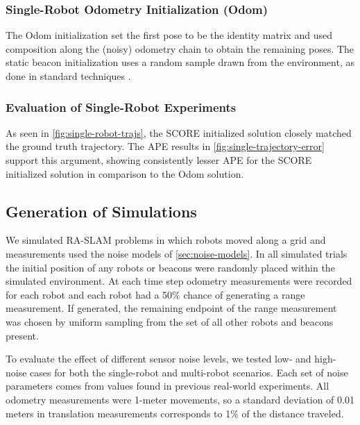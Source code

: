 \SingleRobotGoatsTrajectoryFigure
\SingleRobotGoatAPEBarPlot

\subsubsection{Single-Robot Odometry Initialization (Odom)}
\label{sec:single-robot-odom-init}

The Odom initialization set the first pose to be the identity matrix and used
composition along the (noisy) odometry chain to obtain the remaining poses. The
static beacon initialization uses a random sample drawn from the environment, as
done in standard techniques \cite{Newman03icra,guo2017ijmav}.

\subsubsection{Evaluation of Single-Robot Experiments}

As seen in \cref{fig:single-robot-trajs}, the SCORE initialized solution closely
matched the ground truth trajectory. The APE results in
\cref{fig:single-trajectory-error} support this argument, showing consistently
lesser APE for the SCORE initialized solution in comparison to the Odom
solution.

\subsection{Generation of Simulations}
\label{sec:generation-simulated-experiments}


We simulated RA-SLAM problems in which robots moved along a grid and
measurements used the noise models of \cref{sec:noise-models}. In all simulated
trials the initial position of any robots or beacons were randomly placed within
the simulated environment. At each time step odometry measurements were recorded
for each robot and each robot had a 50\% chance of generating a range
measurement. If generated, the remaining endpoint of the range measurement was
chosen by uniform sampling from the set of all other robots and beacons present.

\SingleRobotTrajectoryFigure
\SingleRobotAPEBoxPlot

To evaluate the effect of different sensor noise levels, we tested low- and
high-noise cases for both the single-robot and multi-robot scenarios. Each set
of noise parameters comes from values found in previous real-world experiments.
All odometry measurements were 1-meter movements, so a standard deviation of
0.01 meters in translation measurements corresponds to 1\% of the distance
traveled.


